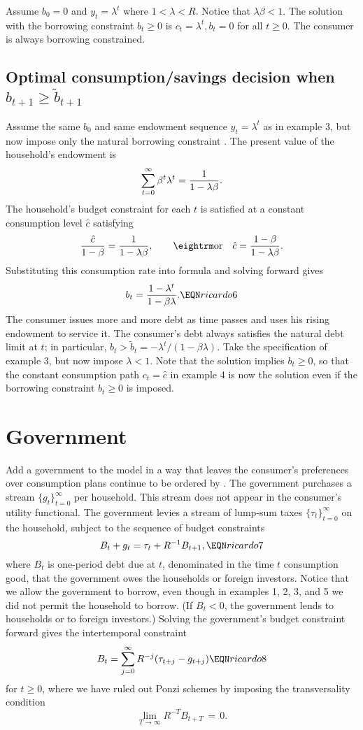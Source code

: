 \medskip
{} \quad  Assume $b_0=0$ and
$ y_t = \lambda^t$ where $1 < \lambda < R$.  Notice that
$\lambda \beta <1$.  The solution with the borrowing constraint
$b_t \geq 0$ is $c_t = \lambda^t , b_t=0$ for all $t \geq 0$.
The consumer is always borrowing constrained.
\medskip

\subsection{Optimal  consumption/savings decision when $b_{t+1} \geq \tilde b_{t+1}$}
 \quad  Assume the same  $b_0$ and same endowment
sequence $ y_t = \lambda^t$ as in example 3, but now impose only
the natural borrowing constraint .   The present
value of the household's endowment is
$$ \sum_{t=0}^\infty \beta^t \lambda^t = {1 \over 1 -\lambda \beta}.$$
The household's budget constraint for each $t$ is
satisfied at a constant consumption level $\hat c$ satisfying
$$
{\hat c \over 1 -\beta} = {1 \over 1-\lambda \beta}, \qquad \hbox{\rm or}
\quad  \hat c = {1-\beta \over 1 - \lambda \beta}.
$$   Substituting
this consumption rate into formula  and solving forward gives
$$ b_t =
   {1  - \lambda^t \over 1 - \beta \lambda }. \EQN ricardo6$$
   The consumer issues more and more debt as time passes
and uses his rising endowment to service it.   The
consumer's debt always satisfies the
natural debt limit at $t$; in particular, $ b_t > \tilde b_t = -\lambda^t /(1 - \beta \lambda)$.
\medskip
{} \quad   Take the specification of example 3,
but now impose  $\lambda <1$.    Note that the solution
 implies $b_t  \geq 0$, so that the constant consumption
path $c_t = \hat c$ in example 4
 is now the solution even if the borrowing constraint $b_t \geq 0$
is imposed.

\section{Government}
Add a government  to the model in a way that leaves the consumer's preferences over consumption plans continue to be ordered by
.   The government
purchases a stream $\{g_t\}_{t=0}^\infty$  per household.  This stream does not appear in the consumer's utility functional.
The government levies
 a stream of lump-sum taxes $\{\tau_t\}_{t=0}^\infty$
on the   household, subject to the sequence of budget constraints
$$ B_t + g_t = \tau_t + R^{-1} B_{t+1}, \EQN ricardo7 $$
where $B_t$ is one-period  debt  due at $t$, denominated
in the time $t$ consumption good, that the government owes the households
or foreign investors.  Notice that we allow the government
to borrow, even though in  examples 1, 2,  3, and 5
 we did not permit the household to borrow. (If $B_t <0$, the
government lends to households or to foreign investors.)  Solving the
government's budget constraint forward gives the intertemporal constraint
$$ B_t = \sum_{j=0}^\infty R^{-j}(\tau_{t+j} - g_{t+j}) \EQN ricardo8$$
for $t \geq 0$, where we have ruled out Ponzi schemes by imposing the
transversality condition
$$
\lim_{T\to\infty} R^{-T} B_{t+T} \,=\, 0.
$$


